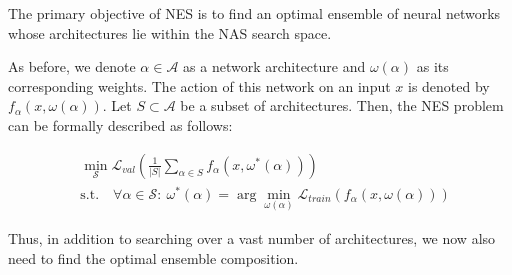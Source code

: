 \documentclass[USenglish]{article}
\theoremstyle{dgthm}
\begin{document}
The primary objective of NES is to find an optimal ensemble of neural networks whose architectures lie within the NAS search space.

As before, we denote $\alpha \in \mathcal{A}$ as a network architecture and $\omega(\alpha)$ as its corresponding weights. The action of this network on an input $x$ is denoted by $f_{\alpha}(x, \omega(\alpha))$. Let $S \subset \mathcal{A}$ be a subset of architectures. Then, the NES problem can be formally described as follows:

\begin{equation}
    \begin{aligned}
        &\min_{\mathcal{S}} \mathcal{L}_{val} \left( \frac{1}{|S|} \sum\limits_{\alpha \in S} f_\alpha(x, \omega^*(\alpha))\right) \\
        & \text{s.t.} \quad \forall \alpha \in \mathcal{S}: \  \omega^*(\alpha) = \arg \min_{\omega(\alpha)} \mathcal{L}_{train}(f_\alpha(x, \omega(\alpha)))
    \end{aligned}
\end{equation}

Thus, in addition to searching over a vast number of architectures, we now also need to find the optimal ensemble composition.




\end{document}
